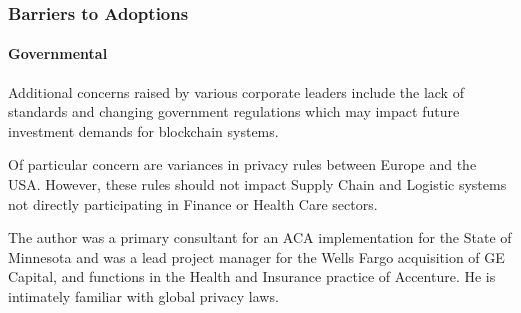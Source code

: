 \begin{frame}
  \frametitle{Barriers to Adoptions}
  \framesubtitle{Governmental}
  \begin{itemize}
          Additional concerns raised by various corporate leaders include the lack of standards and changing government regulations which may impact future investment demands for blockchain systems.

          Of particular concern are variances in privacy rules between Europe and the USA. However, these rules should not impact Supply Chain and Logistic systems not directly participating in Finance or Health Care sectors.

           {\scriptsize{The author was a primary consultant for an ACA implementation for the State of Minnesota and was a lead project manager for the Wells Fargo acquisition of GE Capital, and functions in the Health and Insurance practice of Accenture. He is intimately familiar with global privacy laws. }}

  \end{itemize}
\end{frame}
